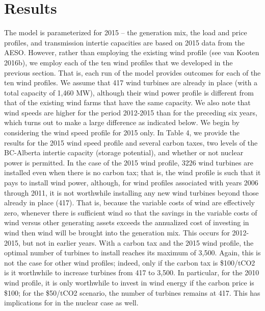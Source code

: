 \section{Results}
\label{sec:Results}




The model is parameterized for 2015 – the generation mix, the load and price profiles, and transmission intertie capacities are based on 2015 data from the AESO. However, rather than employing the existing wind profile (see van Kooten 2016b), we employ each of the ten wind profiles that we developed in the previous section. That is, each run of the model provides outcomes for each of the ten wind profiles. We assume that 417 wind turbines are already in place (with a total capacity of 1,460 MW), although their wind power profile is different from that of the existing wind farms that have the same capacity. We also note that wind speeds are higher for the period 2012-2015 than for the preceding six years, which turns out to make a large difference as indicated below. We begin by considering the wind speed profile for 2015 only. 
In Table 4, we provide the results for the 2015 wind speed profile and several carbon taxes, two levels of the BC-Alberta intertie capacity (storage potential), and whether or not nuclear power is permitted. In the case of the 2015 wind profile, 3226 wind turbines are installed even when there is no carbon tax; that is, the wind profile is such that it pays to install wind power, although, for wind profiles associated with years 2006 through 2011, it is not worthwhile installing any new wind turbines beyond those already in place (417). That is, because the variable costs of wind are effectively zero, whenever there is sufficient wind so that the savings in the variable costs of wind versus other generating assets exceeds the annualized cost of investing in wind then wind will be brought into the generation mix. This occurs for 2012-2015, but not in earlier years.  
With a carbon tax and the 2015 wind profile, the optimal number of turbines to install reaches its maximum of 3,500. Again, this is not the case for other wind profiles; indeed, only if the carbon tax is \$100/tCO2 is it worthwhile to increase turbines from 417 to 3,500. In particular, for the 2010 wind profile, it is only worthwhile to invest in wind energy if the carbon price is \$100; for the \$50/tCO2 scenario, the number of turbines remains at 417. This has implications for in the nuclear case as well. 


